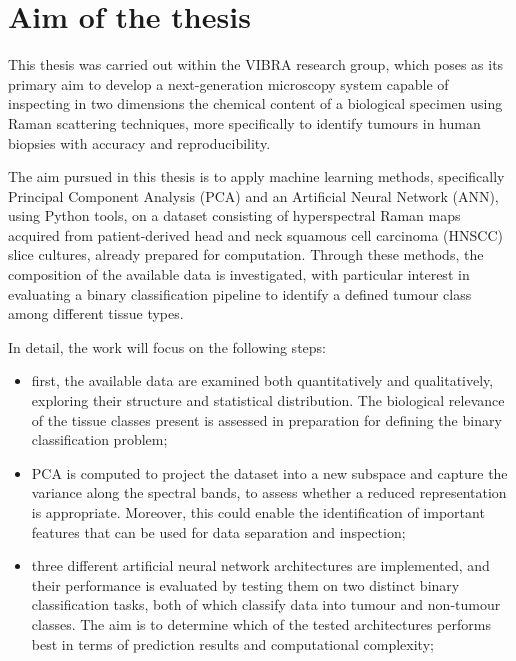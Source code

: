 
\chapter{Aim of the thesis}
\label{sec:aim_thesis}

This thesis was carried out within the VIBRA research group, which poses as its primary aim to develop a next-generation microscopy system capable of inspecting in two dimensions the chemical content of a biological specimen using Raman scattering techniques, more specifically to identify tumours in human biopsies with accuracy and reproducibility.

The aim pursued in this thesis is to apply machine learning methods, specifically Principal Component Analysis (PCA) and an Artificial Neural Network (ANN), using Python tools, on a dataset consisting of hyperspectral Raman maps acquired from
patient-derived head and neck squamous cell carcinoma (HNSCC) slice cultures, already prepared for computation. Through these methods, the composition of the available data is investigated, with particular interest in evaluating a binary classification pipeline to identify a defined tumour class among different tissue types.

In detail, the work will focus on the following steps:
\begin{itemize}
    \item first, the available data are examined both quantitatively and qualitatively, exploring their structure and statistical distribution. The biological relevance of the tissue classes present is assessed in preparation for defining the binary classification problem;

    \item PCA is computed to project the dataset into a new subspace and capture the variance along the spectral bands, to assess whether a reduced representation is appropriate. Moreover, this could enable the identification of important features that can be used for data separation and inspection;

    \item three different artificial neural network architectures are implemented, and their performance is evaluated by testing them on two distinct binary classification tasks, both of which classify data into tumour and non-tumour classes. The aim is to determine which of the tested architectures performs best in terms of prediction results and computational complexity;
\end{itemize}


